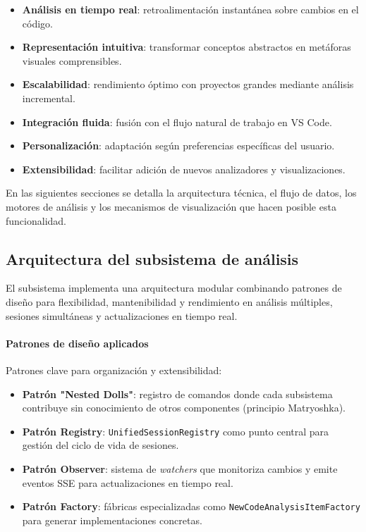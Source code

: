 \documentclass[a4paper, 12pt]{book}
\begin{document}
\begin{itemize}
  \item \textbf{Análisis en tiempo real}: retroalimentación instantánea sobre cambios en el código.
  \item \textbf{Representación intuitiva}: transformar conceptos abstractos en metáforas visuales comprensibles.
  \item \textbf{Escalabilidad}: rendimiento óptimo con proyectos grandes mediante análisis incremental.
  \item \textbf{Integración fluida}: fusión con el flujo natural de trabajo en VS Code.
  \item \textbf{Personalización}: adaptación según preferencias específicas del usuario.
  \item \textbf{Extensibilidad}: facilitar adición de nuevos analizadores y visualizaciones.
\end{itemize}

En las siguientes secciones se detalla la arquitectura técnica, el flujo de datos, los motores de análisis y los mecanismos de visualización que hacen posible esta funcionalidad.

\subsection{Arquitectura del subsistema de análisis}
\label{sec:arquitectura-analisis}

El subsistema implementa una arquitectura modular combinando patrones de diseño para flexibilidad, mantenibilidad y rendimiento en análisis múltiples, sesiones simultáneas y actualizaciones en tiempo real.

\paragraph{Patrones de diseño aplicados}
Patrones clave para organización y extensibilidad:

\begin{itemize}
  \item \textbf{Patrón "Nested Dolls"}: registro de comandos donde cada subsistema contribuye sin conocimiento de otros componentes (principio Matryoshka).
  \item \textbf{Patrón Registry}: \texttt{UnifiedSessionRegistry} como punto central para gestión del ciclo de vida de sesiones.
  \item \textbf{Patrón Observer}: sistema de \emph{watchers} que monitoriza cambios y emite eventos SSE para actualizaciones en tiempo real.
  \item \textbf{Patrón Factory}: fábricas especializadas como \texttt{NewCodeAnalysisItemFactory} para generar implementaciones concretas.
\end{itemize}
\end{document}
